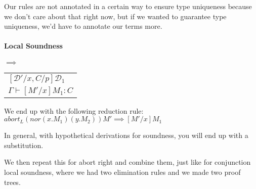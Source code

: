 \documentclass[12 pt]{article}
\begin{document}
\begin{prooftree}
\end{prooftree}
\begin{prooftree}
\end{prooftree}
\begin{prooftree}
\end{prooftree}
\begin{prooftree}
\end{prooftree}
\begin{prooftree}
\end{prooftree}
Our rules are not annotated in a certain way to ensure type
uniqueness because we don't care about that right now, but if
we wanted to guarantee type uniqueness, we'd have to annotate
our terms more.
\paragraph{Local Soundness}
\begin{center}
	\noLine
	\noLine
	\noLine
	\DP
	$\implies$
	\begin{tabular}{l}
		$[\mathcal{D}'/x, C/p] \mathcal{D}_1$
		\\ $\Gamma \vdash [M'/x]M_1 : C$
	\end{tabular}
\end{center}
We end up with the following reduction rule:
\\ $abort_L (nor(x.M_1) (y.M_2))M' \implies [M'/x]M_1$

In general, with hypothetical derivations for soundness, you
will end up with a substitution.

We then repeat this for abort right and combine them, just like
for conjunction local soundness, where we had two elimination
rules and we made two proof trees.
\end{document}
